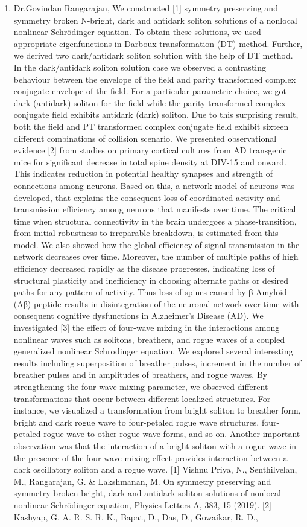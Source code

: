 \begin{enumerate}
\item Dr.Govindan Rangarajan, We constructed [1] symmetry preserving and symmetry broken N-bright, dark and antidark soliton solutions of a nonlocal nonlinear Schrödinger equation. To obtain these solutions, we used appropriate eigenfunctions in Darboux transformation (DT) method. Further, we derived two dark/antidark soliton solution with the help of DT method. In the dark/antidark soliton solution case we observed a contrasting behaviour between the envelope of the ﬁeld and parity transformed complex conjugate envelope of the ﬁeld. For a particular parametric choice, we got dark (antidark) soliton for the ﬁeld while the parity transformed complex conjugate ﬁeld exhibits antidark (dark) soliton. Due to this surprising result, both the ﬁeld and PT transformed complex conjugate ﬁeld exhibit sixteen different combinations of collision scenario.   We presented observational evidence [2] from studies on primary cortical cultures from AD transgenic mice for significant decrease in total spine density at DIV-15 and onward. This indicates reduction in potential healthy synapses and strength of connections among neurons. Based on this, a network model of neurons was developed, that explains the consequent loss of coordinated activity and transmission efficiency among neurons that manifests over time. The critical time when structural connectivity in the brain undergoes a phase-transition, from initial robustness to irreparable breakdown, is estimated from this model. We also showed how the global efficiency of signal transmission in the network decreases over time. Moreover, the number of multiple paths of high efficiency decreased rapidly as the disease progresses, indicating loss of structural plasticity and inefficiency in choosing alternate paths or desired paths for any pattern of activity. Thus loss of spines caused by β-Amyloid (Aβ) peptide results in disintegration of the neuronal network over time with consequent cognitive dysfunctions in Alzheimer’s Disease (AD).  We investigated [3] the effect of four-wave mixing in the interactions among nonlinear waves such as solitons, breathers, and rogue waves of a coupled generalized nonlinear Schrodinger equation. We explored several interesting results including superposition of breather pulses, increment in the number of breather pulses and in amplitudes of breathers, and rogue waves. By strengthening the four-wave mixing parameter, we observed different transformations that occur between different localized structures. For instance, we visualized a transformation from bright soliton to breather form, bright and dark rogue wave to four-petaled rogue wave structures, four-petaled rogue wave to other rogue wave forms, and so on. Another important observation was that the interaction of a bright soliton with a rogue wave in the presence of the four-wave mixing effect provides interaction between a dark oscillatory soliton and a rogue wave.  [1] Vishnu Priya, N., Senthilvelan, M.,  Rangarajan, G. & Lakshmanan, M. On symmetry preserving and symmetry broken bright, dark and antidark soliton solutions of nonlocal nonlinear Schrödinger equation, Physics Letters A, 383, 15 (2019).   [2] Kashyap, G. A. R. S. R. K., Bapat, D., Das, D., Gowaikar, R. D., 
\end{enumerate}
